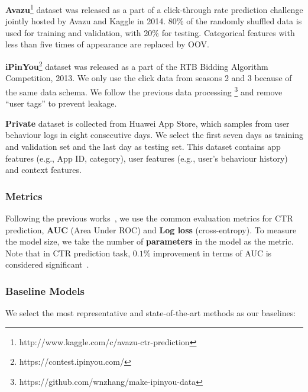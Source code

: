 \documentclass[conference]{IEEEtran}
\begin{document}
\textbf{Avazu}\footnote{http://www.kaggle.com/c/avazu-ctr-prediction} dataset was released as a part of a click-through rate prediction challenge jointly hosted by Avazu and Kaggle in 2014. 80\% of the randomly shuffled data is used for training and validation, with 20\% for testing. Categorical features with less than five times of appearance are replaced by OOV.

\textbf{iPinYou}\footnote{https://contest.ipinyou.com/} dataset was released as a part of the RTB Bidding Algorithm Competition, 2013. We only use the click data from seasons 2 and 3 because of the same data schema. We follow the previous data processing \cite{PNN19}\footnote{https://github.com/wnzhang/make-ipinyou-data} and remove “user tags” to prevent leakage.

\textbf{Private} dataset is collected from Huawei App Store, which samples from user behaviour logs in eight consecutive days. We select the first seven days as training and validation set and the last day as testing set. This dataset contains app features (e.g., App ID, category), user features (e.g., user's behaviour history) and context features. 

\subsubsection{Metrics}

Following the previous works~\cite{DeepFM,PNN16,PNN19}, we use the common evaluation metrics for CTR prediction, \textbf{AUC} (Area Under ROC) and \textbf{Log loss} (cross-entropy). To measure the model size, we take the number of \textbf{parameters} in the model as the metric. Note that in CTR prediction task, $\mathbf{0.1 \%}$ improvement in terms of AUC is considered significant~\cite{Wide_Deep,FM2}.

\subsubsection{Baseline Models}

We select the most representative and state-of-the-art methods as our baselines: 
\end{document}
